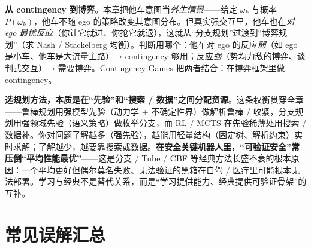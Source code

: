 \textbf{从 contingency 到博弈}。本章把他车意图当\emph{外生情景}——给定 $\omega_k$ 与概率 $P(\omega_k)$，他车不随 ego 的策略改变其意图分布。但真实强交互里，他车也在\emph{对 ego 最优反应}（你让它就进、你抢它就退），这就从“分支规划”过渡到“博弈规划”（求 Nash / Stackelberg 均衡）。判断用哪个：他车对 ego 的反应\emph{弱}（如 ego 是小车、他车是大流量主路）→ contingency 够用；反应\emph{强}（势均力敌的博弈、谈判式交互）→ 需要博弈。Contingency Games 把两者结合：在博弈框架里做 contingency。

\begin{insight}
\textbf{选规划方法，本质是在“先验”和“搜索 / 数据”之间分配资源}。这条权衡贯穿全章——鲁棒规划用强模型先验（动力学 + 不确定性界）做解析鲁棒 / 收紧，分支规划用强领域先验（语义策略）做枚举分支，而 RL / MCTS 在先验稀薄处用搜索 / 数据补。你对问题了解越多（强先验），越能用轻量结构（固定树、解析约束）实时求解；了解越少，越要靠搜索或数据。\textbf{在安全关键机器人里，“可验证安全”常压倒“平均性能最优”}——这是分支 / Tube / CBF 等经典方法长盛不衰的根本原因：一个平均更好但偶尔莫名失败、无法验证的黑箱在自驾 / 医疗里可能根本无法部署。学习与经典不是替代关系，而是“学习提供能力、经典提供可验证骨架”的互补。
\end{insight}

\section*{常见误解汇总}


